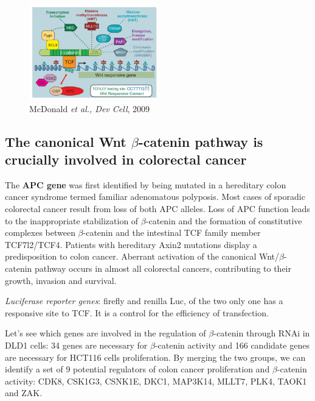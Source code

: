 \begin{figure}
\centering
\includegraphics[width=0.5\textwidth]{../_resources/Screenshot_2022-10-07_at_11-52-58.png}
\caption{McDonald \emph{et al., Dev Cell}, 2009}
\label{fig:domains}
\end{figure}



\hypertarget{the-canonical-wntux3b2-catenin-pathway-is-crucially-involved-in-colorectal-cancer}{%
\subsection{The canonical Wnt $\beta$-catenin pathway is crucially involved in colorectal cancer}\label{the-canonical-wntux3b2-catenin-pathway-is-crucially-involved-in-colorectal-cancer}}

The \textbf{APC gene} was first identified by being mutated in a hereditary colon cancer syndrome termed familiar adenomatous polyposis. Most cases of sporadic colorectal cancer result from loss of both APC alleles. Loss of APC function leads to the inappropriate stabilization of $\beta$-catenin and the formation of constitutive complexes between $\beta$-catenin and the intestinal TCF family member TCF7l2/TCF4. Patients with hereditary Axin2 mutations display a predisposition to colon cancer. Aberrant activation of the canonical Wnt/$\beta$-catenin pathway occurs in almost all colorectal cancers, contributing to their growth, invasion and survival.

\emph{Luciferase reporter genes}: firefly and renilla Luc, of the two only one has a responsive site to TCF. It is a control for the efficiency of transfection.

Let's see which genes are involved in the regulation of $\beta$-catenin through RNAi in DLD1 cells: 34 genes are necessary for $\beta$-catenin activity and 166 candidate genes are necessary for HCT116 cells proliferation. By merging the two groups, we can identify a set of 9 potential regulators of colon cancer proliferation and $\beta$-catenin activity: CDK8, CSK1G3, CSNK1E, DKC1, MAP3K14, MLLT7, PLK4, TAOK1 and ZAK.

